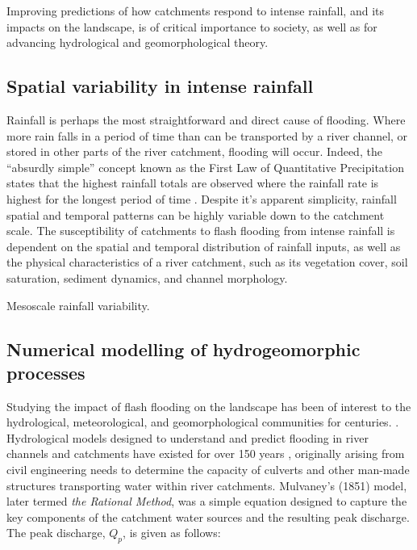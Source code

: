 Improving predictions of how catchments respond to intense rainfall, and its impacts on the landscape, is of critical importance to society, as well as for advancing hydrological and geomorphological theory.

\subsection{Spatial variability in intense rainfall}
Rainfall is perhaps the most straightforward and direct cause of flooding. Where more rain falls in a period of time than can be transported  by a river channel, or stored in other parts of the river catchment, flooding will occur. Indeed, the ``absurdly simple'' concept known as the First Law of Quantitative Precipitation states that the highest rainfall totals are observed where the rainfall rate is highest for the longest period of time \citep{Doswell1996}. Despite it's apparent simplicity, rainfall spatial and temporal patterns can be highly variable down to the catchment scale. The susceptibility of catchments to flash flooding from intense rainfall is dependent on the spatial and temporal distribution of rainfall inputs, as well as the physical characteristics of a river catchment, such as its vegetation cover, soil saturation, sediment dynamics, and channel morphology.


Mesoscale rainfall variability.

\subsection{Numerical modelling of hydrogeomorphic processes}

Studying the impact of flash flooding on the landscape has  been of interest to the hydrological, meteorological, and geomorphological communities for centuries. \citep[e.g.][]{dana1882flood,schumm1979geomorphic,Costa1995}. Hydrological models designed to understand and predict flooding in river channels and catchments have existed for over 150 years \citep{mulvaney1851use}, originally arising from civil engineering needs to determine the capacity of culverts and other man-made structures transporting water within river catchments. Mulvaney's (1851) model, later termed \textit{the Rational Method}, was a simple equation designed to capture the key components of the catchment water sources and the resulting peak discharge. The peak discharge, \(Q_p\), is given as follows:

